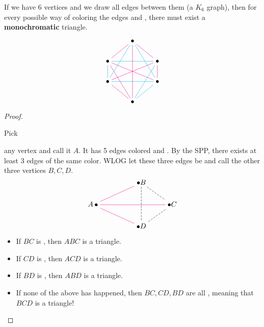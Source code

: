 \documentclass[12pt]{article}
\begin{document}
\begin{theorem}
    If we have 6 vertices and we draw all edges between them (a $K_6$ graph), then for every possible way of coloring the edges  and , there must exist a \textbf{monochromatic} triangle.

    \[\begin{tikzcd}[ampersand replacement=\&,cramped]
        \& \bullet \\
        \bullet \&\& \bullet \\
        \bullet \&\& \bullet \\
        \& \bullet
        \arrow[color=magenta, no head, from=1-2, to=2-1]
        \arrow[color=magenta, no head, from=1-2, to=2-3]
        \arrow[color=magenta, no head, from=2-3, to=3-3]
        \arrow[color=cyan, no head, from=3-3, to=4-2]
        \arrow[color=magenta, no head, from=4-2, to=3-1]
        \arrow[color=cyan, no head, from=2-1, to=2-3]
        \arrow[color=magenta, no head, from=2-3, to=3-1]
        \arrow[color=cyan, no head, from=3-1, to=2-1]
        \arrow[color=magenta, no head, from=2-1, to=3-3]
        \arrow[color=cyan, no head, from=3-3, to=3-1]
        \arrow[color=magenta, no head, from=1-2, to=4-2]
        \arrow[color=magenta, no head, from=2-1, to=4-2]
        \arrow[color=cyan, no head, from=4-2, to=2-3]
        \arrow[color=cyan, no head, from=1-2, to=3-3]
        \arrow[color=cyan, no head, from=1-2, to=3-1]
    \end{tikzcd}\]
\end{theorem}
\begin{proof}
    \hypertarget{k6k3k3}{Pick} any vertex and call it $A$. It has 5 edges colored  and . By the SPP, there exists at least 3 edges of the same color. WLOG let these three edges be  and call the other three vertices $B,C,D$.
    \[\begin{tikzcd}[ampersand replacement=\&,cramped]
        \&\& {\bullet B} \\
        {A\,\bullet} \&\&\& {\bullet C} \\
        \&\& {\bullet D}
        \arrow[color=magenta, no head, from=2-1, to=1-3]
        \arrow[color=magenta, no head, from=2-1, to=2-4]
        \arrow[color=magenta, no head, from=2-1, to=3-3]
        \arrow[dashed, no head, from=1-3, to=2-4]
        \arrow[dashed, no head, from=3-3, to=2-4]
        \arrow[dashed, no head, from=1-3, to=3-3]
    \end{tikzcd}\]
    \begin{itemize}
        \item If $BC$ is , then $ABC$ is a  triangle.
        \item If $CD$ is , then $ACD$ is a  triangle.
        \item If $BD$ is , then $ABD$ is a  triangle.
        \item If none of the above has happened, then $BC,CD,BD$ are all , meaning that $BCD$ is a  triangle!
    \end{itemize}
\end{proof}
\end{document}
